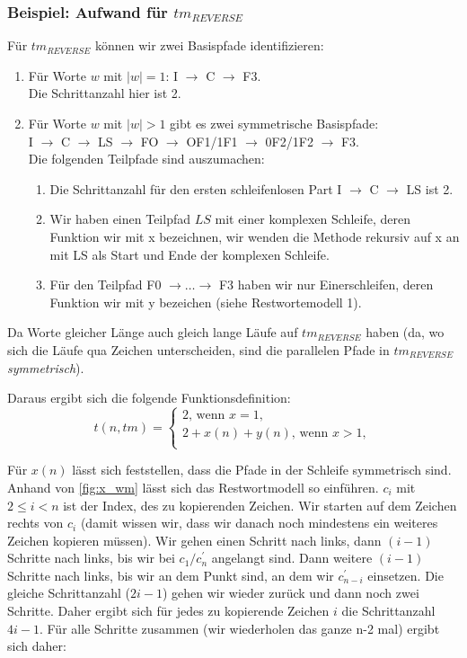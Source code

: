 \subsubsection{Beispiel: Aufwand für $tm_{REVERSE}$}

Für $tm_{REVERSE}$ können wir zwei Basispfade identifizieren:
\begin{enumerate}
        \item Für Worte $w$ mit $|w| = 1$: I $\rightarrow$ C $\rightarrow$ F3.\\
            Die Schrittanzahl hier ist 2.
        \item Für Worte $w$ mit $|w| > 1$ gibt es zwei symmetrische Basispfade:\\
            I $\rightarrow$ C $\rightarrow$ LS $\rightarrow$ FO $\rightarrow$ OF1/1F1 $\rightarrow$ 0F2/1F2 $\rightarrow$ F3.\\
            Die folgenden Teilpfade sind auszumachen:
            \begin{enumerate}
                \item Die Schrittanzahl für den ersten schleifenlosen Part I $\rightarrow$ C $\rightarrow$ LS ist 2.\\
                \item Wir haben einen Teilpfad $LS$ mit einer komplexen Schleife, deren Funktion wir mit x bezeichnen,
                    wir wenden die Methode rekursiv auf x an mit LS als Start und Ende der komplexen Schleife.
                \item Für den Teilpfad F0 $\rightarrow \ldots \rightarrow$ F3 haben wir nur Einerschleifen,
                    deren Funktion wir mit y bezeichen (siehe Restwortemodell 1).
            \end{enumerate}
\end{enumerate}

Da Worte gleicher Länge auch gleich lange Läufe auf $tm_{REVERSE}$ haben
(da, wo sich die Läufe qua Zeichen unterscheiden,
sind die parallelen Pfade in $tm_{REVERSE}$ \emph{symmetrisch}).

Daraus ergibt sich die folgende Funktionsdefinition:
\[
    t(n, tm) = \begin{cases}
        2\text{, wenn } x = 1,\\
        2 + x(n) + y(n) \text{, wenn } x > 1,\\
    \end{cases}
\]
            
Für $x(n)$ lässt sich feststellen, dass die Pfade in der Schleife symmetrisch sind.
Anhand von \autoref{fig:x_wm} lässt sich das Restwortmodell so einführen.
$c_i$ mit $2 \leq i < n$ ist der Index, des zu kopierenden Zeichen.
Wir starten auf dem Zeichen rechts von $c_i$ (damit wissen wir,
dass wir danach noch mindestens ein weiteres Zeichen kopieren müssen).
Wir gehen einen Schritt nach links,
dann $(i-1)$ Schritte nach links, bis wir bei $c_1/c^{'}_{n}$ angelangt sind.
Dann weitere $(i-1)$ Schritte nach links, bis wir an dem Punkt sind, an dem
wir $c^{'}_{n-i}$ einsetzen.
Die gleiche Schrittanzahl ($2i -1$) gehen wir wieder zurück und dann noch zwei Schritte.
Daher ergibt sich für jedes zu kopierende Zeichen $i$ die Schrittanzahl $4i - 1$.
Für alle Schritte zusammen (wir wiederholen das ganze n-2 mal) ergibt sich daher:

